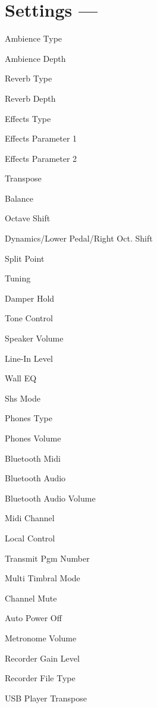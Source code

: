 \section{Settings --- }

Ambience Type


Ambience Depth

Reverb Type


Reverb Depth

Effects Type

Effects Parameter 1


Effects Parameter 2

Transpose


Balance

Octave Shift

Dynamics/Lower Pedal/Right Oct. Shift


Split Point




Tuning

Damper Hold

Tone Control


Speaker Volume

Line-In Level


Wall EQ

Shs Mode

Phones Type


Phones Volume

Bluetooth Midi


Bluetooth Audio

Bluetooth Audio Volume

Midi Channel


Local Control

Transmit Pgm Number


Multi Timbral Mode

Channel Mute

Auto Power Off


Metronome Volume

Recorder Gain Level


Recorder File Type

USB Player Transpose

